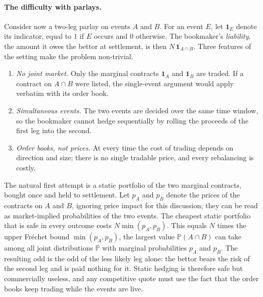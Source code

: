 \documentclass[11pt,a4paper]{article}
\theoremstyle{plain}
\theoremstyle{definition}
\theoremstyle{remark}
\newcommand{\Prob}{\mathbb{P}}
\newcommand{\1}{\mathbf{1}}
\begin{document}
\paragraph{The difficulty with parlays.}
Consider now a two-leg parlay on events $A$ and $B$. For an event $E$, let $\1_E$ denote its indicator, equal to $1$ if $E$ occurs and $0$ otherwise. The bookmaker's \emph{liability}, the amount it owes the bettor at settlement, is then $N\,\1_{A\cap B}$. Three features of the setting make the problem non-trivial.
\begin{enumerate}[label=(\roman*)]
  \item \emph{No joint market.} Only the marginal contracts $\1_A$ and $\1_B$ are traded. If a contract on $A\cap B$ were listed, the single-event argument would apply verbatim with its order book.
  \item \emph{Simultaneous events.} The two events are decided over the same time window, so the bookmaker cannot hedge sequentially by rolling the proceeds of the first leg into the second.
  \item \emph{Order books, not prices.} At every time the cost of trading depends on direction and size; there is no single tradable price, and every rebalancing is costly.
\end{enumerate}
The natural first attempt is a static portfolio of the two marginal contracts, bought once and held to settlement. Let $p_A$ and $p_B$ denote the prices of the contracts on $A$ and $B$, ignoring price impact for this discussion; they can be read as market-implied probabilities of the two events. The cheapest static portfolio that is safe in every outcome costs $N\min(p_A,p_B)$. This equals $N$ times the upper Fréchet bound $\min(p_A,p_B)$, the largest value $\Prob(A\cap B)$ can take among all joint distributions $\Prob$ with marginal probabilities $p_A$ and $p_B$. The resulting odd is the odd of the less likely leg alone: the bettor bears the risk of the second leg and is paid nothing for it. Static hedging is therefore safe but commercially useless, and any competitive quote must use the fact that the order books keep trading while the events are live.
\end{document}
